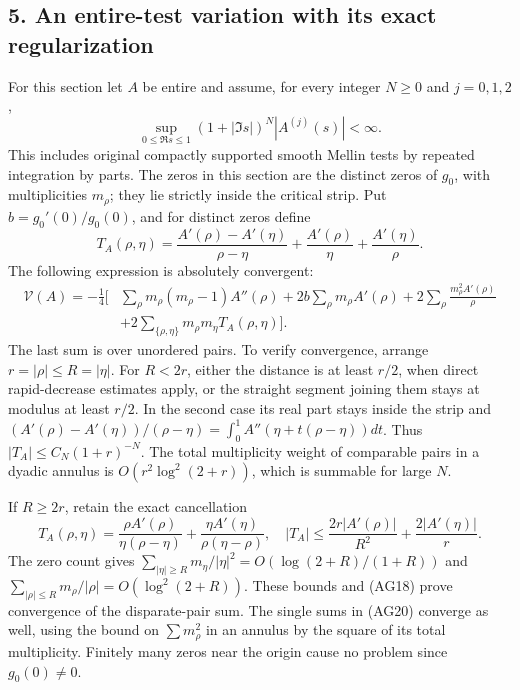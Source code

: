 \documentclass[
  10pt,
  a4paper,
]{article}
\begin{document}
\subsection{5. An entire-test variation with its exact
regularization}\label{an-entire-test-variation-with-its-exact-regularization}

For this section let \(A\) be entire and assume, for every integer
\(N\ge0\) and \(j=0,1,2\), \[
\sup_{0\le\Re s\le1}(1+|\Im s|)^N|A^{(j)}(s)|<\infty.
\tag{AG18}
\] This includes original compactly supported smooth Mellin tests by
repeated integration by parts. The zeros in this section are the
distinct zeros of \(g_0\), with multiplicities \(m_\rho\); they lie
strictly inside the critical strip. Put \(b=g_0'(0)/g_0(0)\), and for
distinct zeros define \[
T_A(\rho,\eta)=\frac{A'(\rho)-A'(\eta)}{\rho-\eta}
+\frac{A'(\rho)}\eta+\frac{A'(\eta)}\rho.
\tag{AG19}
\] The following expression is absolutely convergent: \[
\begin{aligned}
\mathcal V(A)=-\frac14\Bigg[&\sum_\rho m_\rho(m_\rho-1)A''(\rho)
+2b\sum_\rho m_\rho A'(\rho)
+2\sum_\rho\frac{m_\rho^2A'(\rho)}\rho\\
&+2\sum_{\{\rho,\eta\}}m_\rho m_\eta T_A(\rho,\eta)\Bigg].
\end{aligned}\tag{AG20}
\] The last sum is over unordered pairs. To verify convergence, arrange
\(r=|\rho|\le R=|\eta|\). For \(R<2r\), either the distance is at least
\(r/2\), when direct rapid-decrease estimates apply, or the straight
segment joining them stays at modulus at least \(r/2\). In the second
case its real part stays inside the strip and
\((A'(\rho)-A'(\eta))/(\rho-\eta)=\int_0^1A''(\eta+t(\rho-\eta))dt\).
Thus \(|T_A|\le C_N(1+r)^{-N}\). The total multiplicity weight of
comparable pairs in a dyadic annulus is \(O(r^2\log^2(2+r))\), which is
summable for large \(N\).

If \(R\ge2r\), retain the exact cancellation \[
T_A(\rho,\eta)=\frac{\rho A'(\rho)}{\eta(\rho-\eta)}
+\frac{\eta A'(\eta)}{\rho(\eta-\rho)},\quad
|T_A|\le\frac{2r|A'(\rho)|}{R^2}+\frac{2|A'(\eta)|}r.
\tag{AG21}
\] The zero count gives
\(\sum_{|\eta|\ge R}m_\eta/|\eta|^2=O(\log(2+R)/(1+R))\) and
\(\sum_{|\rho|\le R}m_\rho/|\rho|=O(\log^2(2+R))\). These bounds and
(AG18) prove convergence of the disparate-pair sum. The single sums in
(AG20) converge as well, using the bound on \(\sum m_\rho^2\) in an
annulus by the square of its total multiplicity. Finitely many zeros
near the origin cause no problem since \(g_0(0)\ne0\).
\end{document}

